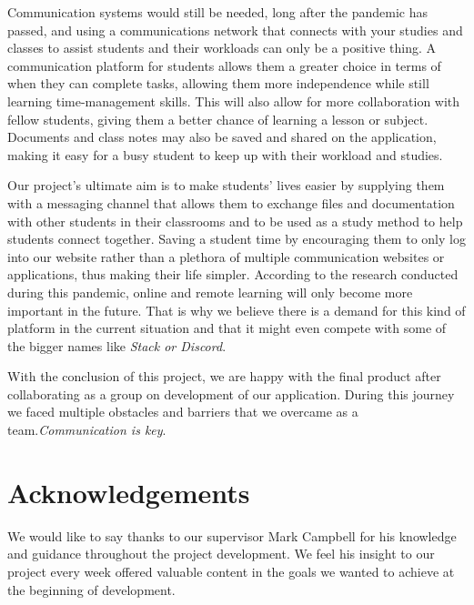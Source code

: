 Communication systems would still be needed, long after the pandemic has passed, and using a communications network that connects with your studies and classes to assist students and their workloads can only be a positive thing. A communication platform for students allows them a greater choice in terms of when they can complete tasks, allowing them more independence while still learning time-management skills. This will also allow for more collaboration with fellow students, giving them a better chance of learning a lesson or subject. Documents and class notes may also be saved and shared on the application, making it easy for a busy student to keep up with their workload and studies.\hfill \break

Our project's ultimate aim is to make students' lives easier by supplying them with a messaging channel that allows them to exchange files and documentation with other students in their classrooms and to be used as a study method to help students connect together. Saving a student time by encouraging them to only log into our website rather than a plethora of multiple communication websites or applications, thus making their life simpler. According to the research conducted during this pandemic, online and remote learning will only become more important in the future. That is why we believe there is a demand for this kind of platform in the current situation and that it might even compete with some of the bigger names like \textit{Stack or Discord}. \hfill \break 

With the conclusion of this project, we are happy with the final product after collaborating as a group on development of our application. During this journey we faced multiple obstacles and barriers that we overcame as a team.\textit{Communication is key}.

\chapter{Acknowledgements }
We would like to say thanks to our supervisor Mark Campbell for his knowledge and guidance throughout the project development. We feel his insight to our project every week offered valuable content in the goals we wanted to achieve at the beginning of development.


